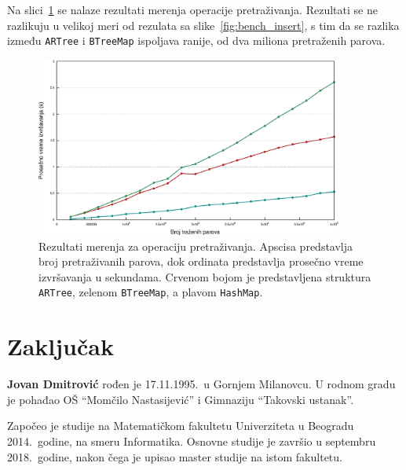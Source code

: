 \documentclass[12pt,oneside]{memoir}
\begin{document}
Na slici~\ref{fig:bench_get} se nalaze rezultati merenja operacije
pretraživanja. Rezultati se ne razlikuju u velikoj meri od rezulata sa
slike~\ref{fig:bench_insert}, s tim da se razlika između \texttt{ARTree}
i \texttt{BTreeMap} ispoljava ranije, od dva miliona pretraženih
parova.

\begin{figure}[!h]
  \centering
  \includegraphics[width=0.90\textwidth]{lines_get.eps}
  \caption{
    Rezultati merenja za operaciju pretraživanja. Apscisa predstavlja broj
    pretraživanih parova, dok ordinata predstavlja prosečno vreme izvršavanja u sekundama.
    Crvenom bojom je predstavljena struktura
    \texttt{ARTree}, zelenom \texttt{BTreeMap}, a plavom \texttt{HashMap}.
  }
  \label{fig:bench_get}
\end{figure}


\chapter{Zaključak}

\literatura

\backmatter

\begin{biografija}
  \textbf{Jovan Dmitrović} rođen je 17.11.1995.\ u Gornjem Milanovcu.
  U rodnom gradu je pohađao OŠ ``Momčilo Nastasijević'' i Gimnaziju
  ``Takovski ustanak''.

  Započeo je studije na Matematičkom fakultetu Univerziteta u Beogradu
  2014.\ godine, na smeru Informatika. Osnovne studije je završio
  u septembru 2018.\ godine, nakon čega je upisao master studije
  na istom fakultetu.
\end{biografija}
\end{document}
